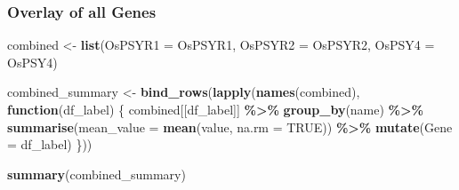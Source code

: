 \documentclass[
]{article}
\newenvironment{Shaded}{\begin{snugshade}}{\end{snugshade}}
\newcommand{\AttributeTok}[1]{\textcolor[rgb]{0.13,0.29,0.53}{#1}}
\newcommand{\ConstantTok}[1]{\textcolor[rgb]{0.56,0.35,0.01}{#1}}
\newcommand{\ControlFlowTok}[1]{\textcolor[rgb]{0.13,0.29,0.53}{\textbf{#1}}}
\newcommand{\FunctionTok}[1]{\textcolor[rgb]{0.13,0.29,0.53}{\textbf{#1}}}
\newcommand{\NormalTok}[1]{#1}
\newcommand{\OtherTok}[1]{\textcolor[rgb]{0.56,0.35,0.01}{#1}}
\newcommand{\SpecialCharTok}[1]{\textcolor[rgb]{0.81,0.36,0.00}{\textbf{#1}}}
\begin{document}
\subsubsection{Overlay of all Genes}\label{overlay-of-all-genes}

\begin{Shaded}
\begin{Highlighting}[]
\NormalTok{combined }\OtherTok{\textless{}{-}} \FunctionTok{list}\NormalTok{(}\AttributeTok{OsPSYR1 =}\NormalTok{ OsPSYR1, }\AttributeTok{OsPSYR2 =}\NormalTok{ OsPSYR2, }\AttributeTok{OsPSY4 =}\NormalTok{ OsPSY4)}

\NormalTok{combined\_summary }\OtherTok{\textless{}{-}} \FunctionTok{bind\_rows}\NormalTok{(}\FunctionTok{lapply}\NormalTok{(}\FunctionTok{names}\NormalTok{(combined), }\ControlFlowTok{function}\NormalTok{(df\_label) \{}
\NormalTok{  combined[[df\_label]] }\SpecialCharTok{\%\textgreater{}\%}
    \FunctionTok{group\_by}\NormalTok{(name) }\SpecialCharTok{\%\textgreater{}\%}
    \FunctionTok{summarise}\NormalTok{(}\AttributeTok{mean\_value =} \FunctionTok{mean}\NormalTok{(value, }\AttributeTok{na.rm =} \ConstantTok{TRUE}\NormalTok{)) }\SpecialCharTok{\%\textgreater{}\%}
    \FunctionTok{mutate}\NormalTok{(}\AttributeTok{Gene =}\NormalTok{ df\_label)}
\NormalTok{\})) }
\end{Highlighting}
\end{Shaded}

\begin{Shaded}
\begin{Highlighting}[]
\FunctionTok{summary}\NormalTok{(combined\_summary)}
\end{Highlighting}
\end{Shaded}
\end{document}
